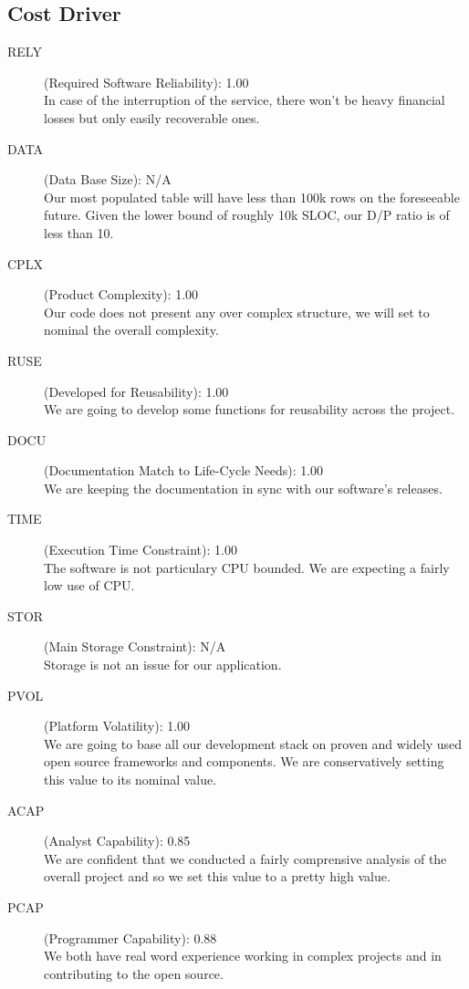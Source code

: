 \documentclass[11pt]{article} %
\begin{document}
\subsection{Cost Driver}

\begin{description}
	\item[RELY] (Required Software Reliability): {\large 1.00} \\ In case of the interruption of the service, there won't be heavy financial losses but only easily recoverable ones.
	\item[DATA] (Data Base Size): {\large N/A} \\ Our most populated table will have less than 100k rows on the foreseeable future. Given the lower bound of roughly 10k SLOC, our D/P ratio is of less than 10.
	\item[CPLX] (Product Complexity): {\large 1.00} \\ Our code does not present any over complex structure, we will set to nominal the overall complexity.
	\item[RUSE] (Developed for Reusability): {\large 1.00} \\ We are going to develop some functions for reusability across the project.
	\item[DOCU] (Documentation Match to Life-Cycle Needs): {\large 1.00} \\ We are keeping the documentation in sync with our software's releases.
	\item [TIME] (Execution Time Constraint): {\large 1.00} \\  The software is not particulary CPU bounded. We are expecting a fairly low use of CPU.
	\item[STOR] (Main Storage Constraint): {\large N/A} \\  Storage is not an issue for our application.
	\item[PVOL] (Platform Volatility): {\large 1.00} \\  We are going to base all our development stack on proven and widely used open source frameworks and components. We are conservatively setting this value to its nominal value.
	\item[ACAP] (Analyst Capability): {\large 0.85} \\  We are confident that we conducted a fairly comprensive analysis of the overall project and so we set this value to a pretty high value.
	\item[PCAP] (Programmer Capability): {\large 0.88} \\  We both have real word experience working in complex projects and in contributing to the open source.

\end{description}
\end{document}
